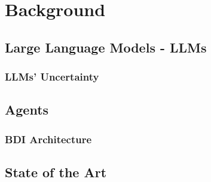\chapter{Background}
\label{cha:background}
\section{Large Language Models - LLMs}
\label{sec:large_language_models_llms}
\subsection{LLMs' Uncertainty}
\label{sub:llms_uncertainty}
\section{Agents}
\label{sec:agents}
\subsection{BDI Architecture}
\label{sub:bdi_architecture}
\section{State of the Art}
\label{sec:state_of_the_art}

